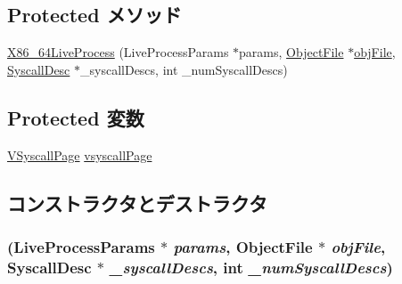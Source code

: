 \subsection*{Protected メソッド}
\begin{DoxyCompactItemize}
\item 
\hyperlink{classX86ISA_1_1X86__64LiveProcess_a35212370da5f0cb7e3b7ddfcea68bced}{X86\_\-64LiveProcess} (LiveProcessParams $\ast$params, \hyperlink{classObjectFile}{ObjectFile} $\ast$\hyperlink{classLiveProcess_ab6cfcfa7903c66267b3e0351c3caa809}{objFile}, \hyperlink{classSyscallDesc}{SyscallDesc} $\ast$\_\-syscallDescs, int \_\-numSyscallDescs)
\end{DoxyCompactItemize}
\subsection*{Protected 変数}
\begin{DoxyCompactItemize}
\item 
\hyperlink{classX86ISA_1_1X86__64LiveProcess_1_1VSyscallPage}{VSyscallPage} \hyperlink{classX86ISA_1_1X86__64LiveProcess_a9f7ed190dd32bddc3f1074ce39168abd}{vsyscallPage}
\end{DoxyCompactItemize}


\subsection{コンストラクタとデストラクタ}
\hypertarget{classX86ISA_1_1X86__64LiveProcess_a35212370da5f0cb7e3b7ddfcea68bced}{
\subsubsection[{X86\_\-64LiveProcess}]{ (LiveProcessParams $\ast$ {\em params}, \/  {\bf ObjectFile} $\ast$ {\em objFile}, \/  {\bf SyscallDesc} $\ast$ {\em \_\-syscallDescs}, \/  int {\em \_\-numSyscallDescs})}}
\label{classX86ISA_1_1X86__64LiveProcess_a35212370da5f0cb7e3b7ddfcea68bced}



